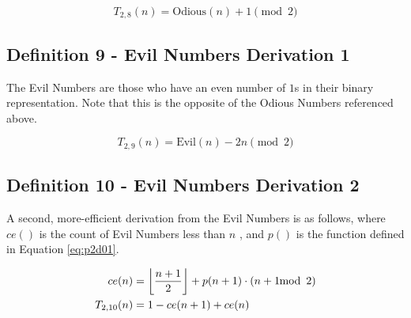 \documentclass[conference]{IEEEtran}
\begin{document}
\begin{equation}
\label{eq:p2d08}
T_{2,8}(n) = \text{Odious}(n) + 1 \pmod{2}
\end{equation}




\subsection{Definition 9 - Evil Numbers Derivation 1}


The Evil Numbers \cite{OEIS-Evil} are those who have an even number of $1$s in their binary representation. Note that this is the opposite of the Odious Numbers referenced above.

\begin{equation}
\label{eq:p2d09}
T_{2,9}(n) = \text{Evil}(n) - 2n \pmod{2}
\end{equation}

\subsection{Definition 10 - Evil Numbers Derivation 2}


A second, more-efficient derivation from the Evil Numbers is as follows, where $ce()$ is the count of Evil Numbers less than $n$ \cite{OEIS-A159481}, and $p()$ is the function defined in Equation \ref{eq:p2d01}.

\begin{equation}
    \label{eq:p2d10}
    \begin{aligned}
     ce(n) &= \floor{\dfrac{n + 1}{2}} + p(n + 1) \cdot (n + 1 \mod{2}) \\
T_{2,10}(n) &= 1 - ce(n + 1) + ce(n)
    \end{aligned}
\end{equation}
\end{document}
